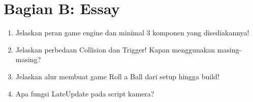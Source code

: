 \section{Bagian B: Essay}

\begin{enumerate}
  \item Jelaskan peran game engine dan minimal 3 komponen yang disediakannya!
  \item Jelaskan perbedaan Collision dan Trigger! Kapan menggunakan masing-masing?
  \item Jelaskan alur membuat game Roll a Ball dari setup hingga build!
  \item Apa fungsi LateUpdate pada script kamera?
\end{enumerate}
